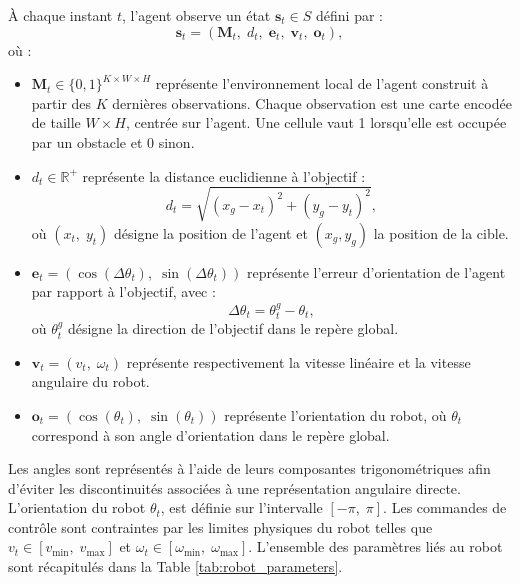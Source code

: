 \noindent À chaque instant $t$, l'agent observe un état $\mathbf{s}_t \in S$ défini par :
$$
    \mathbf{s}_t = (\mathbf{M}_t, \; d_t, \; \mathbf{e}_t, \; \mathbf{v}_t, \; \mathbf{o}_t),
$$
où :
\begin{itemize}

    \item $\mathbf{M}_t \in \{0,1\}^{K \times W \times H}$ représente l'environnement local de l'agent construit à partir des $K$ dernières observations. Chaque observation est une carte encodée de taille $W \times H$, centrée sur l'agent. Une cellule vaut 1 lorsqu'elle est occupée par un obstacle et 0 sinon.

    \item $d_t \in \mathbb{R}^{+}$ représente la distance euclidienne à l'objectif :
          $$
              d_t=\sqrt{(x_g-x_t)^2+(y_g-y_t)^2},
          $$
          où $(x_t, \; y_t)$ désigne la position de l'agent et $(x_g,y_g)$ la
          position de la cible.

    \item $\mathbf{e}_t=(\cos(\Delta\theta_t), \; \sin(\Delta\theta_t))$ représente l'erreur d'orientation de l'agent par rapport à l'objectif, avec :
          $$
              \Delta\theta_t=\theta_t^{g}-\theta_t,
          $$
          où $\theta_t^{g}$ désigne la direction de l'objectif dans le repère global.

    \item $\mathbf{v}_t = (v_t, \; \omega_t)$ représente respectivement la vitesse linéaire et la vitesse angulaire du robot.

    \item $\mathbf{o}_t = (\cos(\theta_t), \; \sin(\theta_t))$ représente l'orientation du robot, où $\theta_t$ correspond à son angle d'orientation dans le repère global.
\end{itemize}

\vspace{10pt}

\noindent Les angles sont représentés à l'aide de leurs composantes trigonométriques afin d'éviter les discontinuités associées à une représentation angulaire directe. L'orientation du robot $\theta_t$, est définie sur l'intervalle $[-\pi, \; \pi]$. Les commandes de contrôle sont contraintes par les limites physiques du robot telles que $v_t \in [v_\text{min}, \; v_\text{max}]$ et $\omega_t \in [\omega_\text{min}, \; \omega_\text{max}]$. L'ensemble des paramètres liés au robot sont récapitulés dans la Table \ref{tab:robot_parameters}.

